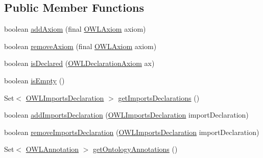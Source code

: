 \subsection*{Public Member Functions}
\begin{DoxyCompactItemize}
\item 
boolean \hyperlink{classuk_1_1ac_1_1manchester_1_1cs_1_1owl_1_1owlapi_1_1_internals_impl_af665ab9604486a8ccbfe379d1073689a}{add\-Axiom} (final \hyperlink{interfaceorg_1_1semanticweb_1_1owlapi_1_1model_1_1_o_w_l_axiom}{O\-W\-L\-Axiom} axiom)
\item 
boolean \hyperlink{classuk_1_1ac_1_1manchester_1_1cs_1_1owl_1_1owlapi_1_1_internals_impl_a59bb8b530c781d1139864c6d871e09c5}{remove\-Axiom} (final \hyperlink{interfaceorg_1_1semanticweb_1_1owlapi_1_1model_1_1_o_w_l_axiom}{O\-W\-L\-Axiom} axiom)
\item 
boolean \hyperlink{classuk_1_1ac_1_1manchester_1_1cs_1_1owl_1_1owlapi_1_1_internals_impl_a891382fc09aa9b907f54983b833ce214}{is\-Declared} (\hyperlink{interfaceorg_1_1semanticweb_1_1owlapi_1_1model_1_1_o_w_l_declaration_axiom}{O\-W\-L\-Declaration\-Axiom} ax)
\item 
boolean \hyperlink{classuk_1_1ac_1_1manchester_1_1cs_1_1owl_1_1owlapi_1_1_internals_impl_a19e8234175bcc998b74e6690c8dcc9b3}{is\-Empty} ()
\item 
Set$<$ \hyperlink{interfaceorg_1_1semanticweb_1_1owlapi_1_1model_1_1_o_w_l_imports_declaration}{O\-W\-L\-Imports\-Declaration} $>$ \hyperlink{classuk_1_1ac_1_1manchester_1_1cs_1_1owl_1_1owlapi_1_1_internals_impl_a2eaf86b5bc56664cb3a42a46d4a5fd75}{get\-Imports\-Declarations} ()
\item 
boolean \hyperlink{classuk_1_1ac_1_1manchester_1_1cs_1_1owl_1_1owlapi_1_1_internals_impl_ab9b291c72bdb1c2f32f67899b709de0d}{add\-Imports\-Declaration} (\hyperlink{interfaceorg_1_1semanticweb_1_1owlapi_1_1model_1_1_o_w_l_imports_declaration}{O\-W\-L\-Imports\-Declaration} import\-Declaration)
\item 
boolean \hyperlink{classuk_1_1ac_1_1manchester_1_1cs_1_1owl_1_1owlapi_1_1_internals_impl_a2cb0e3edb09775147561cbd46b82cdfb}{remove\-Imports\-Declaration} (\hyperlink{interfaceorg_1_1semanticweb_1_1owlapi_1_1model_1_1_o_w_l_imports_declaration}{O\-W\-L\-Imports\-Declaration} import\-Declaration)
\item 
Set$<$ \hyperlink{interfaceorg_1_1semanticweb_1_1owlapi_1_1model_1_1_o_w_l_annotation}{O\-W\-L\-Annotation} $>$ \hyperlink{classuk_1_1ac_1_1manchester_1_1cs_1_1owl_1_1owlapi_1_1_internals_impl_a50e14e966e4251f313aedbb424ac39db}{get\-Ontology\-Annotations} ()

\end{DoxyCompactItemize}
